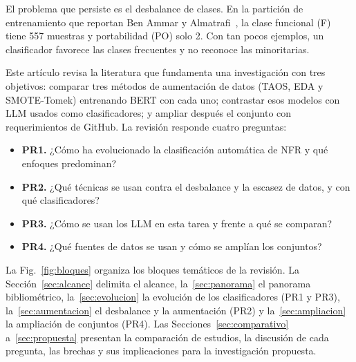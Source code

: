 \documentclass[conference]{IEEEtran}
\begin{document}
El problema que persiste es el desbalance de clases. En la partición de entrenamiento que reportan Ben Ammar y Almatrafi~\cite{BenAmmar2025-TAOS}, la clase funcional (F) tiene 557 muestras y portabilidad (PO) solo 2. Con tan pocos ejemplos, un clasificador favorece las clases frecuentes y no reconoce las minoritarias.

Este artículo revisa la literatura que fundamenta una investigación con tres objetivos: comparar tres métodos de aumentación de datos (TAOS, EDA y SMOTE-Tomek) entrenando BERT con cada uno; contrastar esos modelos con LLM usados como clasificadores; y ampliar después el conjunto con requerimientos de GitHub. La revisión responde cuatro preguntas:
\begin{itemize}
  \item \textbf{PR1.} ¿Cómo ha evolucionado la clasificación automática de NFR y qué enfoques predominan?
  \item \textbf{PR2.} ¿Qué técnicas se usan contra el desbalance y la escasez de datos, y con qué clasificadores?
  \item \textbf{PR3.} ¿Cómo se usan los LLM en esta tarea y frente a qué se comparan?
  \item \textbf{PR4.} ¿Qué fuentes de datos se usan y cómo se amplían los conjuntos?
\end{itemize}

La Fig.~\ref{fig:bloques} organiza los bloques temáticos de la revisión. La Sección~\ref{sec:alcance} delimita el alcance, la~\ref{sec:panorama} el panorama bibliométrico, la~\ref{sec:evolucion} la evolución de los clasificadores (PR1 y PR3), la~\ref{sec:aumentacion} el desbalance y la aumentación (PR2) y la~\ref{sec:ampliacion} la ampliación de conjuntos (PR4). Las Secciones~\ref{sec:comparativo} a~\ref{sec:propuesta} presentan la comparación de estudios, la discusión de cada pregunta, las brechas y sus implicaciones para la investigación propuesta.
\end{document}
